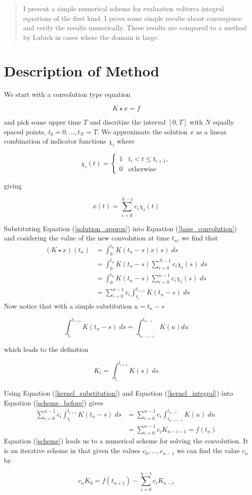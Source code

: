 \documentclass[11pt]{article}
\numberwithin{equation}{section}
\theoremstyle{definition}
\newcommand{\eqn}[2]{
	\begin{equation}
		\label{#1}
		#2
	\end{equation}
}
\newcommand{\eqr}[1]{Equation (\ref{#1})}
\begin{document}
\maketitle
\begin{abstract}
I present a simple numerical scheme for evaluation volterra integral
equations of the first kind. I prove some simple results about
convergence and verify the results numerically. These results are
compared to a method by Lubich in cases where the domain is large.
\end{abstract}
\setcounter{tocdepth}{1}
\tableofcontents
\lstlistoflistings
\listoftables
\section{Description of Method}
We start with a convolution type equation
\eqn{base_convolution}{
	K \star x = f
}
and pick some upper time $T$ and discritize the interval $[0, T]$ with $N$
equally spaced points, $t_0 = 0, ..., t_N = T$. We approximate the solution $x$
as a linear combination of indicator functions $\chi_i$ where
\eqn{indicator_defn}{
	\chi_i(t)
	=
	\left\{
	\begin{array}{ll}
		1 & t_{i} < t \leq t_{i+1} , \\
		0 & \text{otherwise}
	\end{array}
	\right.
}
giving
\eqn{solution_approx}{
	x(t) = \sum_{i=0}^{N-1} c_i \chi_i(t)
}
Substituting \eqr{solution_approx} into \eqr{base_convolution} and cosidering
the value of the new convolution at time $t_n$, we find that
\begin{align}
\nonumber            	(K \star x)(t_n)
                     		&= \int_0^{t_n} K(t_n - s)x(s)\; ds \\
\nonumber            		&= \int_0^{t_n} K(t_n - s) \sum_{i=0}^{N-1} c_i \chi_i(s)\; ds \\
\nonumber            		&= \int_0^{t_n} K(t_n - s) \sum_{i=0}^{n-1} c_i \chi_i(s)\; ds \\
\label{scheme_before}		&= \sum_{i=0}^{n-1} c_i \int_{t_i}^{t_{i+1}} K(t_n - s)\; ds
\end{align}
Now notice that with a simple substitution $u = t_n - s$
\eqn{kernel_substitution}{
	\int_{t_i}^{t_{i+1}}K(t_n - s)\; ds = \int_{t_{n-i-1}}^{t_{n-i}} K(u) du
}
which leads to the definition
\eqn{kernel_integral}{
	K_i = \int_{t_i}^{t_{i+1}} K(s)\; ds
}
Using \eqr{kernel_substitution} and \eqr{kernel_integral} into \eqr{scheme_before}
gives
\begin{align}
\nonumber     	\sum_{i=0}^{n-1} c_i \int_{t_i}^{t_{i+1}} K(t_n - s)\; ds
              		&= \sum_{i=0}^{n-1} c_i \int_{t_{n-i-1}}^{t_{n-i}} K(u)\; du\\
\label{scheme}		&= \sum_{i=0}^{n-1} c_i K_{n-i-1} = f(t_n)
\end{align}
\eqr{scheme} leads us to a numerical scheme for solving the convolution. It is
an iterative scheme in that given the values $c_0, ..., c_{n-1}$ we can find
the value $c_n$ by
\eqn{specific_term}{
	c_nK_0 = f(t_{n+1}) - \sum_{i=0}^{n-1} c_i K_{n-i}
}
\end{document}
